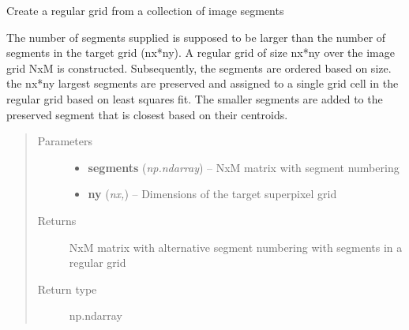 \documentclass[letterpaper,10pt,english]{sphinxmanual}
\begin{document}
\begin{fulllineitems}
\label{segmentation:flamingo.segmentation.postprocess.regularize}
Create a regular grid from a collection of image segments

The number of segments supplied is supposed to be larger than the
number of segments in the target grid (nx*ny). A regular grid of
size nx*ny over the image grid NxM is constructed. Subsequently,
the segments are ordered based on size. the nx*ny largest segments
are preserved and assigned to a single grid cell in the regular
grid based on least squares fit. The smaller segments are added to
the preserved segment that is closest based on their centroids.
\begin{quote}\begin{description}
\item[{Parameters}] \leavevmode\begin{itemize}
\item {} 
\textbf{segments} (\emph{np.ndarray}) -- NxM matrix with segment numbering

\item {} 
\textbf{ny} (\emph{nx,}) -- Dimensions of the target superpixel grid

\end{itemize}

\item[{Returns}] \leavevmode
NxM matrix with alternative segment numbering with segments in
a regular grid

\item[{Return type}] \leavevmode
np.ndarray

\end{description}\end{quote}

\end{fulllineitems}

\end{document}
